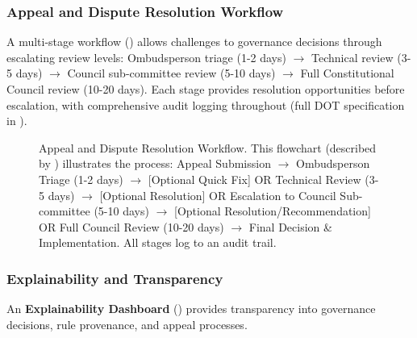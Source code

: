 \documentclass[manuscript,screen,review,anonymous,9pt]{acmart}
\begin{document}
\subsubsection{Appeal and Dispute Resolution Workflow}
A multi-stage workflow () allows challenges to governance decisions through escalating review levels: Ombudsperson triage (1-2 days) $\rightarrow$ Technical review (3-5 days) $\rightarrow$ Council sub-committee review (5-10 days) $\rightarrow$ Full Constitutional Council review (10-20 days). Each stage provides resolution opportunities before escalation, with comprehensive audit logging throughout (full DOT specification in ).

\begin{figure}[htbp]
  \centering
  \caption[Appeal and dispute resolution workflow diagram]{Appeal and Dispute Resolution Workflow. This flowchart (described by ) illustrates the process: Appeal Submission $\rightarrow$ Ombudsperson Triage (1-2 days) $\rightarrow$ [Optional Quick Fix] OR Technical Review (3-5 days) $\rightarrow$ [Optional Resolution] OR Escalation to Council Sub-committee (5-10 days) $\rightarrow$ [Optional Resolution/Recommendation] OR Full Council Review (10-20 days) $\rightarrow$ Final Decision \& Implementation. All stages log to an audit trail.}
  \label{fig:appeal_workflow}
\end{figure}

\subsubsection{Explainability and Transparency}
An \textbf{Explainability Dashboard} () provides transparency into governance decisions, rule provenance, and appeal processes.
\end{document}
